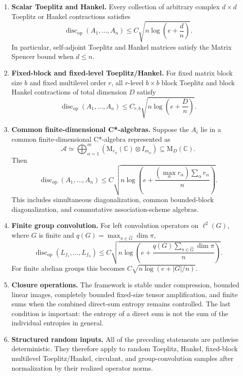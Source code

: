 \documentclass[11pt]{amsart}
\numberwithin{equation}{section}
\theoremstyle{definition}
\theoremstyle{remark}
\newcommand{\C}{\mathbb C}
\newcommand{\M}{\mathrm M}
\newcommand{\op}{\mathrm{op}}
\newcommand{\discop}{\operatorname{disc}_{\op}}
\newcommand{\mcA}{\mathcal A}
\begin{document}
\begin{enumerate}[leftmargin=2em]
\item \textbf{Scalar Toeplitz and Hankel.} Every collection of arbitrary complex
$d\times d$ Toeplitz or Hankel contractions satisfies
\[
\discop(A_1,\ldots,A_n)
\le C\sqrt{n\log\left(e+\frac{d}{n}\right)} .
\]
In particular, self-adjoint Toeplitz and Hankel matrices satisfy the Matrix
Spencer bound when $d\le n$.

\item \textbf{Fixed-block and fixed-level Toeplitz/Hankel.} For fixed matrix
block size $b$ and fixed multilevel order $r$, all $r$-level $b\times b$ block
Toeplitz and block Hankel contractions of total dimension $D$ satisfy
\[
\discop(A_1,\ldots,A_n)
\le C_{r,b}\sqrt{n\log\left(e+\frac{D}{n}\right)} .
\]

\item \textbf{Common finite-dimensional C*-algebras.} Suppose the $A_i$ lie in a
common finite-dimensional C*-algebra represented as
\[
\mcA \simeq \bigoplus_{\alpha=1}^m
\left(\M_{r_\alpha}(\C)\otimes I_{m_\alpha}\right)
\subseteq \M_D(\C).
\]
Then
\[
\discop(A_1,\ldots,A_n)
\le C\sqrt{n\log\left(e+
\frac{(\max_\alpha r_\alpha)\sum_\alpha r_\alpha}{n}
\right)} .
\]
This includes simultaneous diagonalization, common bounded-block
diagonalization, and commutative association-scheme algebras.

\item \textbf{Finite group convolution.} For left convolution operators on
$\ell^2(G)$, where $G$ is finite and $q(G)=\max_{\pi\in\widehat G}\dim\pi$,
\[
\discop(L_{f_1},\ldots,L_{f_n})
\le C\sqrt{n\log\left(e+
\frac{q(G)\sum_{\pi\in\widehat G}\dim\pi}{n}
\right)} .
\]
For finite abelian groups this becomes
$C\sqrt{n\log(e+|G|/n)}$.

\item \textbf{Closure operations.} The framework is stable under compression,
bounded linear images, completely bounded fixed-size tensor amplification, and
finite sums when the combined direct-sum entropy remains controlled. The last
condition is important: the entropy of a direct sum is not the sum of the
individual entropies in general.

\item \textbf{Structured random inputs.} All of the preceding statements are
pathwise deterministic. They therefore apply to random Toeplitz, Hankel,
fixed-block multilevel Toeplitz/Hankel, circulant, and group-convolution samples
after normalization by their realized operator norms.
\end{enumerate}
\end{document}
